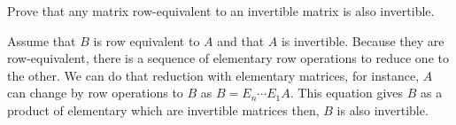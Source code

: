 
\begin{Exercise}[
name={},
title={}, 
difficulty=0,
origin={\cite{JH}}]
    Prove that any matrix row-equivalent to an invertible matrix is also
    invertible.
\end{Exercise}
\begin{Answer}
      Assume that $B$ is row equivalent to $A$ and that $A$ is invertible.
      Because they are row-equivalent, there is a sequence of elementary row 
operations  
      to reduce one to the other.
      We can do that reduction with elementary matrices, for instance, $A$ can 
      change by row operations to $B$ as $B=E_n\cdots E_1A$.
      This equation gives $B$ as a product of elementary which are invertible matrices then, $B$ is also invertible.  
\end{Answer}
